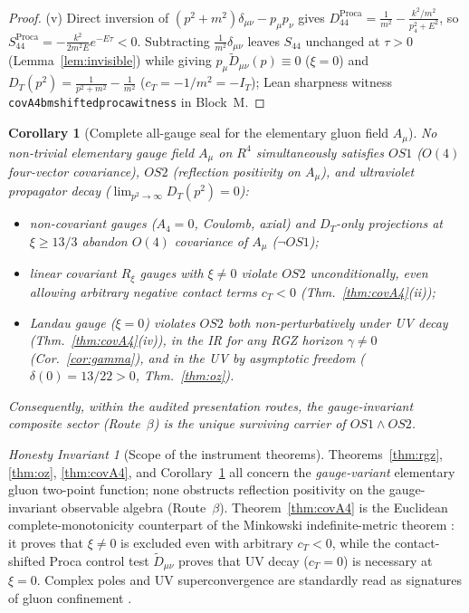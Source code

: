 \documentclass[11pt,a4paper]{article}
\def\R{R}\def\N{N}\def\Q{Q}\def\Z{Z}\def\Class{C}\def\OS{OS}\def\Gap{Gap}%
\theoremstyle{plain}
\newtheorem{corollary}[theorem]{Corollary}
\theoremstyle{definition}
\theoremstyle{remark}
\newtheorem{invariant}[theorem]{Honesty Invariant}
\newcommand{\R}{\mathbb{R}}\newcommand{\N}{\mathbb{N}}\newcommand{\Q}{\mathbb{Q}}
\newcommand{\Z}{\mathbb{Z}}\newcommand{\Spec}{\operatorname{Spec}}
\newcommand{\OS}{\mathrm{OS}}\newcommand{\Gap}{\mathrm{Gap}}
\newcommand{\Class}{\mathcal{C}}\newcommand{\Htot}{\mathcal{H}}
\renewcommand{\_}{\oldunderscore\allowbreak}
\newcommand{\Lean}[1]{\texttt{\small #1}}
\begin{document}
\begin{proof}
(v) Direct inversion of $(p^2+m^2)\delta_{\mu\nu}-p_\mu p_\nu$ gives $D_{44}^{\mathrm{Proca}}=\frac{1}{m^2}-\frac{k^2/m^2}{p_4^2+E^2}$, so $S_{44}^{\mathrm{Proca}}=-\frac{k^2}{2m^2E}e^{-E\tau}<0$. Subtracting $\frac{1}{m^2}\delta_{\mu\nu}$ leaves $S_{44}$ unchanged at $\tau>0$ (Lemma~\ref{lem:invisible}) while giving $p_\mu\widetilde{D}_{\mu\nu}(p)\equiv 0$ ($\xi=0$) and $D_T(p^2)=\frac{1}{p^2+m^2}-\frac{1}{m^2}$ ($c_T=-1/m^2=-I_T$); Lean sharpness witness \Lean{covA4\_bm\_shifted\_proca\_witness} in Block~M.
\end{proof}
\begin{corollary}[Complete all-gauge seal for the elementary gluon field $A_\mu$]\label{cor:allgauges}
No non-trivial elementary gauge field $A_\mu$ on $\R^4$ simultaneously satisfies $\OS1$ ($O(4)$ four-vector covariance), $\OS2$ (reflection positivity on $A_\mu$), and ultraviolet propagator decay ($\lim_{p^2\to\infty}D_T(p^2)=0$):
\begin{itemize}[leftmargin=20pt,itemsep=1pt]
\item non-covariant gauges ($A_4=0$, Coulomb, axial) and $D_T$-only projections at $\xi\ge 13/3$ abandon $O(4)$ covariance of $A_\mu$ ($\neg\OS1$);
\item linear covariant $R_\xi$ gauges with $\xi\neq0$ violate $\OS2$ unconditionally, even allowing arbitrary negative contact terms $c_T<0$ (Thm.~\ref{thm:covA4}(ii));
\item Landau gauge ($\xi=0$) violates $\OS2$ both non-perturbatively under UV decay (Thm.~\ref{thm:covA4}(iv)), in the IR for any RGZ horizon $\gamma\neq0$ (Cor.~\ref{cor:gamma}), and in the UV by asymptotic freedom ($\delta(0)=13/22>0$, Thm.~\ref{thm:oz}).
\end{itemize}
Consequently, within the audited presentation routes, the gauge-invariant composite sector (Route~$\beta$) is the \emph{unique} surviving carrier of $\OS1\wedge\OS2$.
\end{corollary}
\begin{invariant}[Scope of the instrument theorems]\label{inv:rgz-scope}
Theorems~\ref{thm:rgz}, \ref{thm:oz}, \ref{thm:covA4}, and Corollary~\ref{cor:allgauges} all concern the \emph{gauge-variant} elementary gluon two-point function; none obstructs reflection positivity on the gauge-invariant observable algebra (Route~$\beta$). Theorem~\ref{thm:covA4} is the Euclidean complete-monotonicity counterpart of the Minkowski indefinite-metric theorem \cite{KugoOjima1979,StrocchiBook}: it proves that $\xi\neq0$ is excluded even with arbitrary $c_T<0$, while the contact-shifted Proca control test $\widetilde{D}_{\mu\nu}$ proves that UV decay ($c_T=0$) is necessary at $\xi=0$. Complex poles and UV superconvergence are standardly read as signatures of gluon confinement \cite{OehmeZimmermann1980,Hayashi2019,deBrito2024}.
\end{invariant}
\end{document}
